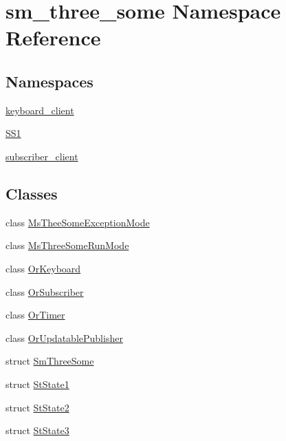 \hypertarget{namespacesm__three__some}{}\section{sm\+\_\+three\+\_\+some Namespace Reference}
\label{namespacesm__three__some}
\subsection*{Namespaces}
\begin{DoxyCompactItemize}
\item 
 \hyperlink{namespacesm__three__some_1_1keyboard__client}{keyboard\+\_\+client}
\item 
 \hyperlink{namespacesm__three__some_1_1SS1}{S\+S1}
\item 
 \hyperlink{namespacesm__three__some_1_1subscriber__client}{subscriber\+\_\+client}
\end{DoxyCompactItemize}
\subsection*{Classes}
\begin{DoxyCompactItemize}
\item 
class \hyperlink{classsm__three__some_1_1MsTheeSomeExceptionMode}{Ms\+Thee\+Some\+Exception\+Mode}
\item 
class \hyperlink{classsm__three__some_1_1MsThreeSomeRunMode}{Ms\+Three\+Some\+Run\+Mode}
\item 
class \hyperlink{classsm__three__some_1_1OrKeyboard}{Or\+Keyboard}
\item 
class \hyperlink{classsm__three__some_1_1OrSubscriber}{Or\+Subscriber}
\item 
class \hyperlink{classsm__three__some_1_1OrTimer}{Or\+Timer}
\item 
class \hyperlink{classsm__three__some_1_1OrUpdatablePublisher}{Or\+Updatable\+Publisher}
\item 
struct \hyperlink{structsm__three__some_1_1SmThreeSome}{Sm\+Three\+Some}
\item 
struct \hyperlink{structsm__three__some_1_1StState1}{St\+State1}
\item 
struct \hyperlink{structsm__three__some_1_1StState2}{St\+State2}
\item 
struct \hyperlink{structsm__three__some_1_1StState3}{St\+State3}
\end{DoxyCompactItemize}
